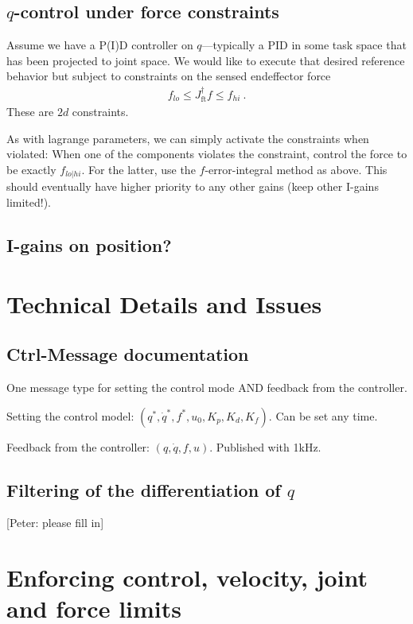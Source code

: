 \documentclass[10pt,fleqn,twoside]{article}
\newcommand{\ft}{\text{ft}}
\begin{document}


\subsection{$q$-control under force constraints}

Assume we have a P(I)D controller on $q$---typically a PID in some
task space that has been projected to joint space. We would like to
execute that desired reference behavior but subject to constraints on
the sensed endeffector force
\begin{align}
f_{lo} \le J^\dag_\ft f \le f_{hi} ~.
\end{align}
These are $2 d$ constraints.

As with lagrange parameters, we can simply activate the constraints
when violated: When one of the components violates the constraint,
control the force to be exactly $f_{lo|hi}$. For the latter, use the
$f$-error-integral method as above. This should eventually have higher
priority to any other gains (keep other I-gains limited!).

\subsection{I-gains on position?}



\section{Technical Details and Issues}

\subsection{Ctrl-Message documentation}

One message type for setting the control mode AND feedback from the
controller.

Setting the control model: $(q^*, \dot q^*, f^*, u_0, K_p, K_d,
K_f)$. Can be set any time.

Feedback from the controller: $(q, \dot q, f, u)$. Published with 1kHz.


\subsection{Filtering of the differentiation of $q$}

[Peter: please fill in]

\section{Enforcing control, velocity, joint and force limits}
\end{document}
